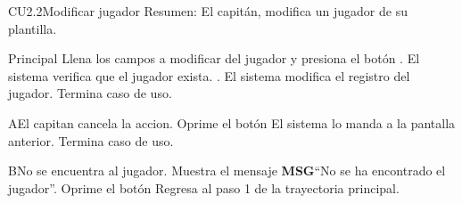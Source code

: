 

	\begin{UseCase}{CU2.2}{Modificar jugador}{
		Resumen: El capitán, modifica un jugador de su plantilla.	}
	\end{UseCase}
	\newpage

	\begin{UCtrayectoria}{Principal}
	\UCpaso[\UCactor] Llena los campos a modificar del jugador y presiona el botón .
	\UCpaso El sistema verifica que el jugador exista. .
	\UCpaso El sistema modifica el registro del jugador.
	 \UCpaso Termina caso de uso.
\end{UCtrayectoria}

	\begin{UCtrayectoriaA}{A}{El capitan cancela la accion.}
		\UCpaso[\UCactor] Oprime el botón 
		\UCpaso El sistema lo manda a la pantalla anterior.
   		\UCpaso Termina caso de uso.
	\end{UCtrayectoriaA}

	\begin{UCtrayectoriaA}{B}{No se encuentra al jugador.}
		\UCpaso Muestra el mensaje {\bf MSG}``No se ha encontrado el jugador''.
		\UCpaso[\UCactor] Oprime el botón 
		\UCpaso[] Regresa al paso 1 de la trayectoria principal.
	\end{UCtrayectoriaA}
